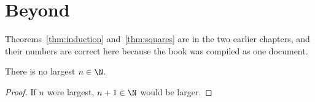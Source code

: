 \chapter{Beyond}
Theorems~\ref{thm:induction} and~\ref{thm:squares} are in the two earlier
chapters, and their numbers are correct here because the book was
compiled as one document.
\begin{theorem}
There is no largest $n \in \N$.
\end{theorem}
\begin{proof}
If $n$ were largest, $n + 1 \in \N$ would be larger.
\end{proof}
